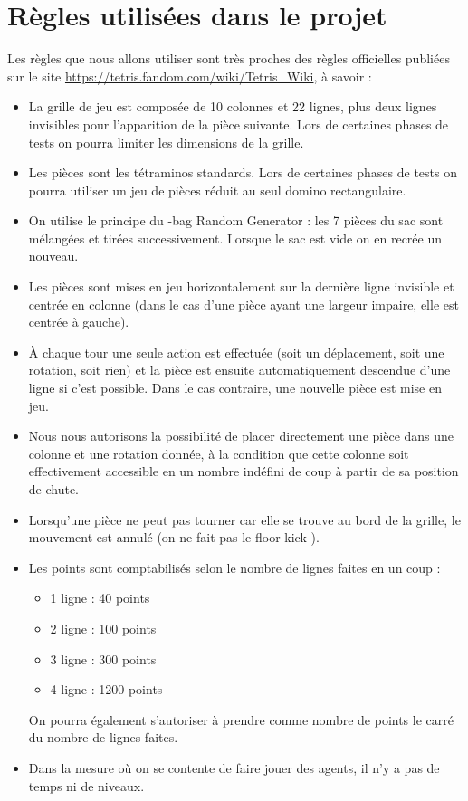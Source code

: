 \chapter{Règles utilisées dans le projet}

Les règles que nous allons utiliser sont très proches des règles officielles publiées sur le site \href{https://tetris.fandom.com/wiki/Tetris_Wiki}{https://tetris.fandom.com/wiki/Tetris\_Wiki}, à savoir :
\begin{itemize}
	\item La grille de jeu est composée de 10 colonnes et 22 lignes, plus deux lignes invisibles pour l'apparition de la pièce suivante. Lors de certaines phases de tests on pourra limiter les dimensions de la grille.
	\item Les pièces sont les tétraminos standards. Lors de certaines phases de tests on pourra utiliser un jeu de pièces réduit au seul domino rectangulaire.
	\item On utilise le principe du -bag Random Generator \fg{} : les 7 pièces du sac sont mélangées et tirées successivement. Lorsque le sac est vide on en recrée un nouveau.
	\item Les pièces sont mises en jeu horizontalement sur la dernière ligne invisible et centrée en colonne (dans le cas d'une pièce ayant une largeur impaire, elle est centrée à gauche).
	\item À chaque tour une seule action est effectuée (soit un déplacement, soit une rotation, soit rien) et la pièce est ensuite automatiquement descendue d'une ligne si c'est possible. Dans le cas contraire, une nouvelle pièce est mise en jeu.
	\item Nous nous autorisons la possibilité de placer directement une pièce dans une colonne et une rotation donnée, à la condition que cette colonne soit effectivement accessible en un nombre indéfini de coup à partir de sa position de chute.
	\item Lorsqu'une pièce ne peut pas tourner car elle se trouve au bord de la grille, le mouvement est annulé (on ne fait pas le \og floor kick \fg{}).
	\item Les points sont comptabilisés selon le nombre de lignes faites en un coup :
	\begin{itemize}
		\item 1 ligne : 40 points
		\item 2 ligne : 100 points
		\item 3 ligne : 300 points
		\item 4 ligne : 1200 points
	\end{itemize}
	On pourra également s'autoriser à prendre comme nombre de points le carré du nombre de lignes faites.
	\item Dans la mesure où on se contente de faire jouer des agents, il n'y a pas de temps ni de niveaux.
	
\end{itemize}